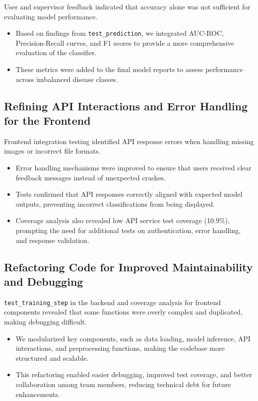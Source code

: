 \documentclass[12pt, titlepage]{article}
\begin{document}
User and supervisor feedback indicated that accuracy alone was not sufficient for evaluating model performance.
\begin{itemize}
    \item Based on findings from \texttt{test\_prediction}, we integrated AUC-ROC, Precision-Recall curves, and F1 scores to provide a more comprehensive evaluation of the classifier.
    \item These metrics were added to the final model reports to assess performance across imbalanced disease classes.
\end{itemize}

\subsection{Refining API Interactions and Error Handling for the Frontend}

Frontend integration testing identified API response errors when handling missing images or incorrect file formats.
\begin{itemize}
    \item Error handling mechanisms were improved to ensure that users received clear feedback messages instead of unexpected crashes.
    \item Tests confirmed that API responses correctly aligned with expected model outputs, preventing incorrect classifications from being displayed.
    \item Coverage analysis also revealed low API service test coverage (10.9\%), prompting the need for additional tests on authentication, error handling, and response validation.
\end{itemize}

\subsection{Refactoring Code for Improved Maintainability and Debugging}

\texttt{test\_training\_step} in the backend and coverage analysis for frontend components revealed that some functions were overly complex and duplicated, making debugging difficult.
\begin{itemize}
    \item We modularized key components, such as data loading, model inference, API interactions, and preprocessing functions, making the codebase more structured and scalable.
    \item This refactoring enabled easier debugging, improved test coverage, and better collaboration among team members, reducing technical debt for future enhancements.
\end{itemize}
\end{document}
